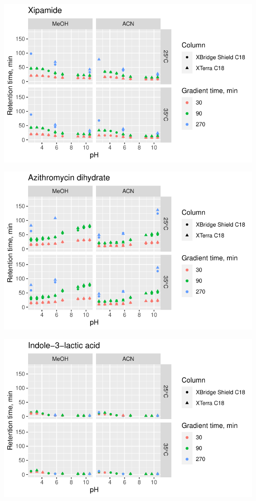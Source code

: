 \documentclass[
  letterpaper,
  DIV=11,
  numbers=noendperiod]{scrreprt}
\begin{document}
\includegraphics{index_files/figure-pdf/unnamed-chunk-4-150.pdf}

\includegraphics{index_files/figure-pdf/unnamed-chunk-4-151.pdf}

\includegraphics{index_files/figure-pdf/unnamed-chunk-4-152.pdf}
\end{document}

